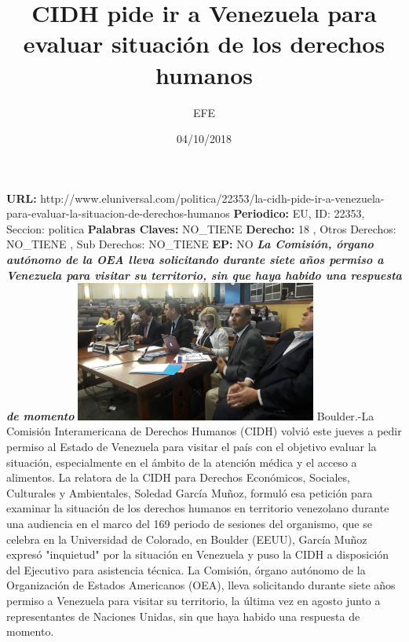 \documentclass{article}%
\title{\textbf{CIDH pide ir a Venezuela para evaluar situación de los derechos humanos}}%
\author{EFE}%
\date{04/10/2018}%
\begin{document}
%
\normalsize%
\maketitle%
\textbf{URL: }%
http://www.eluniversal.com/politica/22353/la{-}cidh{-}pide{-}ir{-}a{-}venezuela{-}para{-}evaluar{-}la{-}situacion{-}de{-}derechos{-}humanos\newline%
%
\textbf{Periodico: }%
EU, %
ID: %
22353, %
Seccion: %
politica\newline%
%
\textbf{Palabras Claves: }%
NO\_TIENE\newline%
%
\textbf{Derecho: }%
18%
, Otros Derechos: %
NO\_TIENE%
, Sub Derechos: %
NO\_TIENE%
\newline%
%
\textbf{EP: }%
NO\newline%
\newline%
%
\textbf{\textit{La Comisión, órgano autónomo de la OEA lleva solicitando durante siete años permiso a Venezuela para visitar su territorio,  sin que haya habido una respuesta de momento}}%
\newline%
\newline%
%
\includegraphics[width=300px]{130.jpg}%
\newline%
%
Boulder.{-}La Comisión Interamericana de Derechos Humanos (CIDH) volvió este jueves a pedir permiso al Estado de Venezuela para visitar el país con el objetivo evaluar la situación, especialmente en el ámbito de la atención médica y el acceso a alimentos.%
\newline%
%
La relatora de la CIDH para Derechos Económicos, Sociales, Culturales y Ambientales, Soledad García Muñoz, formuló esa petición para examinar la situación de los derechos humanos en territorio venezolano durante una audiencia en el marco del 169 periodo de sesiones del organismo, que se celebra en la Universidad de Colorado, en Boulder (EEUU), García Muñoz expresó "inquietud" por la situación en Venezuela y puso la CIDH a disposición del Ejecutivo para asistencia técnica.%
\newline%
%
La Comisión, órgano autónomo de la Organización de Estados Americanos (OEA), lleva solicitando durante siete años permiso a Venezuela para visitar su territorio, la última vez en agosto junto a representantes de Naciones Unidas, sin que haya habido una respuesta de momento.%
\end{document}
